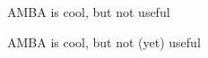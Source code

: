 \begin{frame}

	\centering
	AMBA is cool, but not useful

\end{frame}

\begin{frame}

	\centering
	AMBA is cool, but not (yet) useful

\end{frame}

